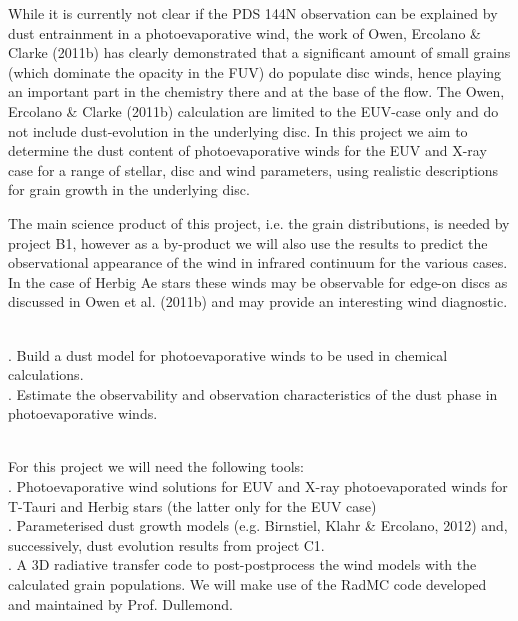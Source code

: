 While it is currently not clear if the PDS 144N observation can be
explained by dust entrainment in a photoevaporative wind, the work of
Owen, Ercolano \& Clarke (2011b) has clearly demonstrated that a
significant amount of small grains (which dominate the opacity in the
FUV) do populate disc winds, hence playing an important part in the
chemistry there and at the base of the flow. The Owen,
Ercolano \& Clarke (2011b) calculation are limited to the EUV-case
only and do not include dust-evolution in the underlying disc. In this project
we aim to determine the dust content of photoevaporative winds for the
EUV and X-ray case for a range of stellar, disc and wind parameters,
using realistic descriptions for grain growth in the underlying
disc. 

The main science product of this project, i.e. the grain
distributions, is needed by project B1, however as a by-product we
will also use the results to predict the observational appearance of the wind in
infrared continuum for the various cases. In the case of Herbig Ae
stars these winds may be observable for edge-on discs as discussed in
Owen et al. (2011b) and may provide an interesting wind diagnostic.  


\vspace{0.5em}
\\
. Build a dust model for photoevaporative winds to be used in chemical calculations. \\
. Estimate the observability and observation characteristics of the dust phase in photoevaporative winds. 

\vspace{0.5em}
\\
For this project we will need the following tools: \\
. Photoevaporative wind solutions for EUV and X-ray photoevaporated winds for T-Tauri and Herbig stars (the latter only for the EUV case)\\
. Parameterised dust growth models (e.g. Birnstiel, Klahr \&
  Ercolano, 2012) and, successively, dust evolution results from project C1. \\
. A 3D radiative transfer code to post-postprocess the wind models with the calculated grain populations. We will make use of the RadMC code developed and maintained by Prof. Dullemond.  \\

